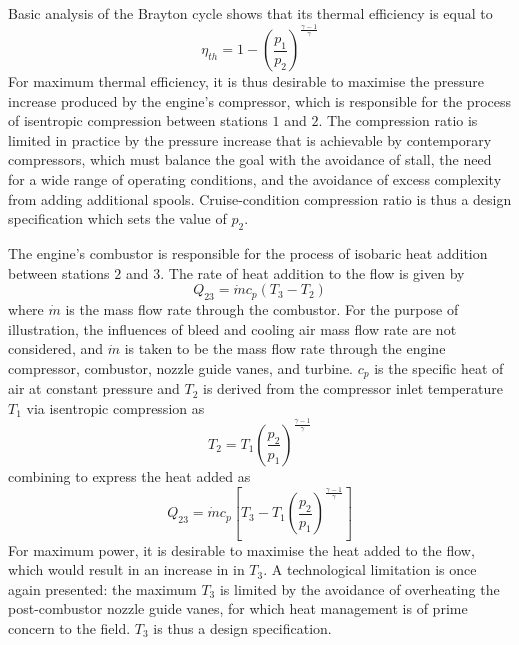 \documentclass[a4paper, 11pt, oneside]{report}
\begin{document}
Basic analysis of the Brayton cycle shows that its thermal efficiency is equal to
\begin{equation}
	\eta_{th} = 
	1 - 
	\left(
		\frac{p_{1}}{p_{2}}
	\right)
	^
	\frac{\gamma-1}{\gamma}
\end{equation}
For maximum thermal efficiency, it is thus desirable to maximise the pressure increase produced by the engine's compressor, which is responsible for the process of isentropic compression between stations $1$ and $2$. The compression ratio is limited in practice by the pressure increase that is achievable by contemporary compressors, which must balance the goal with the avoidance of stall, the need for a wide range of operating conditions, and the avoidance of excess complexity from adding additional spools. Cruise-condition compression ratio is thus a design specification which sets the value of $p_2$.

The engine's combustor is responsible for the process of isobaric heat addition between stations $2$ and $3$. The rate of heat addition to the flow is given by
\begin{equation}
	Q_{23} = 
	\dot{m}
	c_p
	\left(
		T_3 - T_2
	\right)
\end{equation}
where $\dot{m}$ is the mass flow rate through the combustor. For the purpose of illustration, the influences of bleed and cooling air mass flow rate are not considered, and $\dot{m}$ is taken to be the mass flow rate through the engine compressor, combustor, nozzle guide vanes, and turbine. $c_p$ is the specific heat of air at constant pressure and $T_2$ is derived from the compressor inlet temperature $T_1$ via isentropic compression as
\begin{equation}
	T_2 = 
	T_1
	\left(
		\frac{p_2}{p_1}
	\right)
	^
	\frac{\gamma-1}{\gamma}
\end{equation}
combining to express the heat added as
\begin{equation}
	Q_{23} = 
	\dot{m}
	c_p
	\left[
		T_3 - 
		T_1
		\left(
			\frac{p_2}{p_1}
		\right)
		^
		\frac{\gamma-1}{\gamma}
	\right]
\end{equation}
For maximum power, it is desirable to maximise the heat added to the flow, which would result in an increase in in $T_3$. A technological limitation is once again presented: the maximum $T_3$ is limited by the avoidance of overheating the post-combustor nozzle guide vanes, for which heat management is of prime concern to the field. $T_3$ is thus a design specification.
\end{document}
